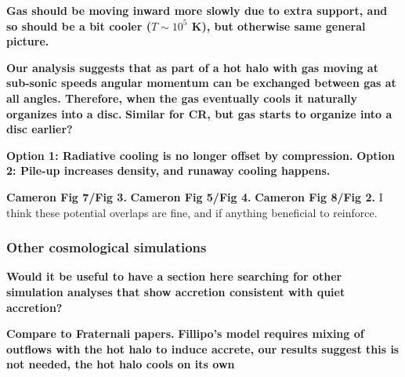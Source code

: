 \documentclass[fleqn,usenatbib]{mnras}
\begin{document}
\textbf{Gas should be moving inward more slowly due to extra support, and so should be a bit cooler ($T\sim 10^5$ K), but otherwise same general picture.}

\textbf{
Our analysis suggests that as part of a hot halo with gas moving at sub-sonic speeds angular momentum can be exchanged between gas at all angles.
Therefore, when the gas eventually cools it naturally organizes into a disc.
}
\textbf{
Similar for CR, but gas starts to organize into a disc earlier?
}

\textbf{Option 1: Radiative cooling is no longer offset by compression.}
\textbf{Option 2: Pile-up increases density, and runaway cooling happens.}

\textbf{Cameron Fig 7/Fig 3.}
\textbf{Cameron Fig 5/Fig 4.}
\textbf{Cameron Fig 8/Fig 2.}
I think these potential overlaps are fine, and if anything beneficial to reinforce.

\subsubsection{Other cosmological simulations}
\label{s: broader prevalance -- other sims}

\textbf{
Would it be useful to have a section here searching for other simulation analyses that show accretion consistent with quiet accretion?
}

\textbf{Compare to Fraternali papers.}
\textbf{Fillipo's model requires mixing of outflows with the hot halo to induce accrete, our results suggest this is not needed, the hot halo cools on its own }
\end{document}

